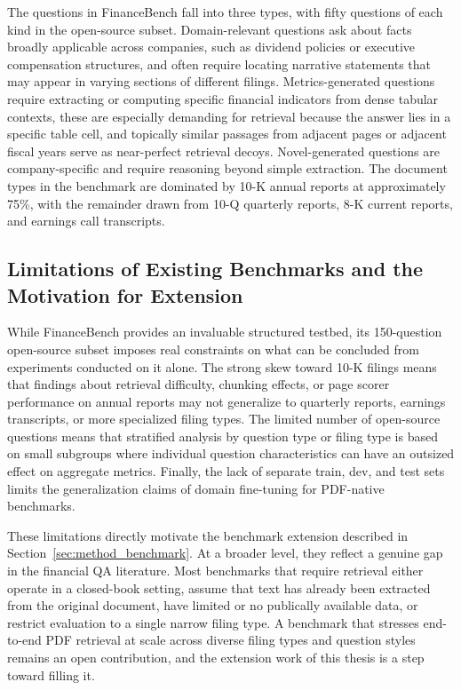 \documentclass[12pt,twoside,maitrise]{dms}
\theoremstyle{definition}
\numberwithin{equation}{section}
\numberwithin{table}{chapter}
\numberwithin{figure}{chapter}
\begin{document}
The questions in FinanceBench fall into three types, with fifty questions of each kind
in the open-source subset. Domain-relevant questions ask about facts broadly applicable
across companies, such as dividend policies or executive compensation structures, and
often require locating narrative statements that may appear in varying sections of
different filings. Metrics-generated questions require extracting or computing specific
financial indicators from dense tabular contexts, these are especially demanding for
retrieval because the answer lies in a specific table cell, and topically similar passages
from adjacent pages or adjacent fiscal years serve as near-perfect retrieval decoys.
Novel-generated questions are company-specific and require reasoning beyond simple
extraction. The document types in the benchmark are dominated by 10-K annual reports at
approximately 75\%, with the remainder drawn from 10-Q quarterly reports, 8-K current
reports, and earnings call transcripts.

\subsection{Limitations of Existing Benchmarks and the Motivation for Extension}

While FinanceBench provides an invaluable structured testbed, its 150-question
open-source subset imposes real constraints on what can be concluded from experiments
conducted on it alone. The strong skew toward 10-K filings means that findings about
retrieval difficulty, chunking effects, or page scorer performance on annual reports may
not generalize to quarterly reports, earnings transcripts, or more specialized filing
types. The limited number of open-source questions means that stratified analysis by question type
or filing type is based on small subgroups where individual question characteristics can
have an outsized effect on aggregate metrics. Finally, the lack of separate train, dev,
and test sets limits the generalization claims of domain fine-tuning for PDF-native
benchmarks.

These limitations directly motivate the benchmark extension described in
Section~\ref{sec:method_benchmark}. At a broader level, they reflect a genuine gap in
the financial QA literature. Most benchmarks that require retrieval either operate in a
closed-book setting, assume that text has already been extracted from the original
document, have limited or no publically available data, or restrict evaluation to a single narrow filing type. A benchmark that stresses
end-to-end PDF retrieval at scale across diverse filing types and question styles remains
an open contribution, and the extension work of this thesis is a step toward filling it.
\end{document}
